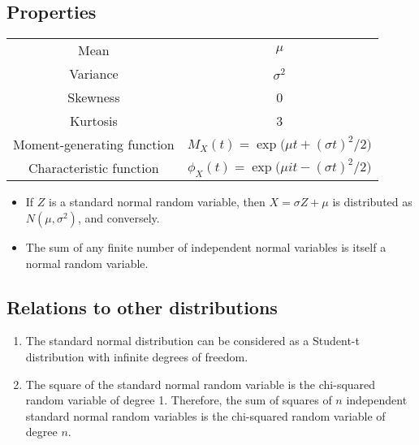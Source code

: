 \documentclass[12pt]{article}
\begin{document}
\subsection*{Properties}

\begin{center}
\begin{tabular}{c|c}
Mean & $\mu$ \\
Variance & $\sigma^2$ \\
Skewness & 0 \\
Kurtosis & 3 \\
\hline
Moment-generating function & $M_X(t) = \exp\bigl(\mu t + (\sigma t)^2/2 \bigr) $ \\
Characteristic function & $\phi_X(t) = \exp\bigl(\mu i t -(\sigma t)^2/2 \bigr) $
\end{tabular}
\end{center}

\begin{itemize}
\item
If $Z$ is a standard normal random variable,
then $X = \sigma Z + \mu$ is distributed as $N(\mu, \sigma^2)$,
and conversely.
\item
The sum of any finite number of independent normal variables is itself
a normal random variable.
\end{itemize}


\subsection*{Relations to other distributions}
\begin{enumerate}
\item
The standard normal distribution can be considered as a Student-t distribution
with infinite degrees of freedom.
\item
The square of the standard normal random variable is the chi-squared random variable of degree 1.  Therefore, the sum of squares of $n$ independent standard normal random variables is the chi-squared random variable of degree $n$.
\end{enumerate}
\end{document}
